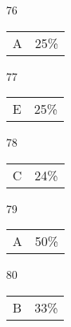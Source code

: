 \documentclass[12pt]{article}
\begin{document}
\begin{multicols}{5}
\begin{enumerate}
\item[]
\item[76] \begin{tabular}{cc} A & 25\%\end{tabular}
\item[77] \begin{tabular}{cc} E & 25\%\end{tabular}
\item[78] \begin{tabular}{cc} C & 24\%\end{tabular}
\item[79] \begin{tabular}{cc} A & 50\%\end{tabular}
\item[80] \begin{tabular}{cc} B & 33\%\end{tabular}

\item[]


\end{enumerate}
\end{multicols}
\end{document}
